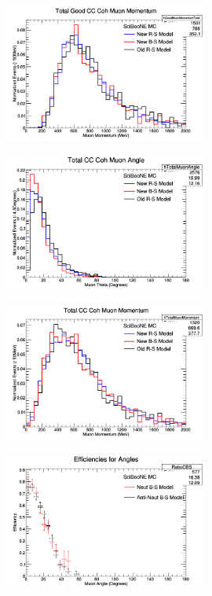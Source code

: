 \documentclass[11pt]{article}
\begin{document}
\begin{figure}[H]
\centering
\includegraphics[width=0.6\textwidth]{NMCombinedPlotsImages/15-NMCombinedPlots.png}
\caption{}
\end{figure}

\begin{figure}[H]
\centering
\includegraphics[width=0.6\textwidth]{NMCombinedPlotsImages/16-NMCombinedPlots.png}
\caption{}
\end{figure}

\begin{figure}[H]
\centering
\includegraphics[width=0.6\textwidth]{NMCombinedPlotsImages/17-NMCombinedPlots.png}
\caption{}
\end{figure}

\begin{figure}[H]
\centering
\includegraphics[width=0.6\textwidth]{NMCombinedPlotsImages/18-NMCombinedPlots.png}
\caption{}
\end{figure}
\end{document}

